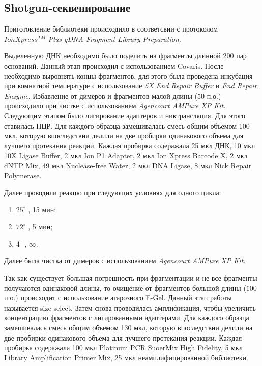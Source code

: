 \subsection{Shotgun-секвенирование}  \label{subsect1_2_4}
Приготовление библиотеки происходило в соответсвии с протоколом $IonXpress^{TM}$ \textit{Plus gDNA Fragment Library Preparation}.

Выделенную ДНК необходимо было поделить на фрагменты длинной 200 пар оснований. Данный этап происходил с использованием Covaris. После необходимо выровнять концы фрагментов, для этого была проведена инкубация при комнатной температуре с использование  \textit{5X End Repair Buffer} и  \textit{End Repair Enzyme}. Избавление от димеров и фрагментов малой длины (\~50 п.о.) происходило при чистке с использованием \textit{Agencourt AMPure XP Kit}. Следующим этапом было лигирование адаптеров и никтрансляция. Для этого ставилась ПЦР. Для каждого образца замешивалась смесь общим объемом 100 мкл, которую впоследствии делили на две пробирки одинакового объема для лучшего протекания реакции. Каждая пробирка содеражала 25 мкл ДНК, 10 мкл 10X Ligase Buffer, 2 мкл Ion P1 Adapter, 2 мкл Ion Xpress Barcode X, 2 мкл dNTP Mix, 49 мкл Nuclease-free Water, 2 мкл DNA Ligase, 8 мкл Nick Repair Polymerase. 

Далее проводили реакцю при следующих условиях для одного цикла:

\begin{enumerate}
	\item $25^{\circ}$ , 15 мин;
	\item $72^{\circ}$ , 5 мин;
	\item $4^{\circ}$ ,  $\infty$.
\end{enumerate}

Далее была чистка от димеров с использованием \textit{Agencourt AMPure XP Kit}.

Так как существует большая погрешность при фрагментации и не все фрагменты получаются одинаковой длины, то очищение от фрагментов большой длины (\~100 п.о.) происходит с использование агарозного E-Gel. Данный этап работы называется size-select. Затем снова проводилась амплификация, чтобы увеличить концентрацию фрагментов с лигированными адаптерами. Для каждого образца замешивалась смесь общим объемом 130 мкл, которую впоследствии делили на две пробирки одинакового объема для лучшего протекания реакции. Каждая пробирка содеражала 100 мкл Platinum PCR SuoerMix High Fidelity, 5 мкл Library Amplification Primer Mix, 25 мкл неамплифицированной библиотеки. 

